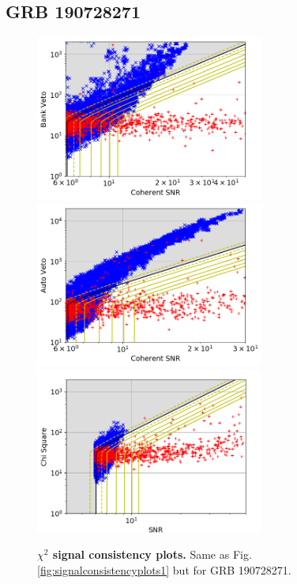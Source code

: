 \documentclass[binding=0.6cm, LaM]{sapthesis}
\begin{document}
\subsection{GRB 190728271}
        \begin{figure}[!t]
          \noindent
          \label{scplots2_final}
          \centering
            \includegraphics[width=0.67\textwidth]{GRB190728271_bank_veto_vs_snr_zoom}\\
            \includegraphics[width=0.67\textwidth]{GRB190728271_auto_veto_vs_snr_zoom}\\
            \includegraphics[width=0.67\textwidth]{GRB190728271_chi_square_vs_snr_zoom}%
          \caption{\textbf{$\chi^2$ signal consistency plots.} Same as Fig.\,\ref{fig:signalconsistencyplots1} but for GRB 190728271.}
          \label{fig:scplots2_final}
        \end{figure}
\end{document}
